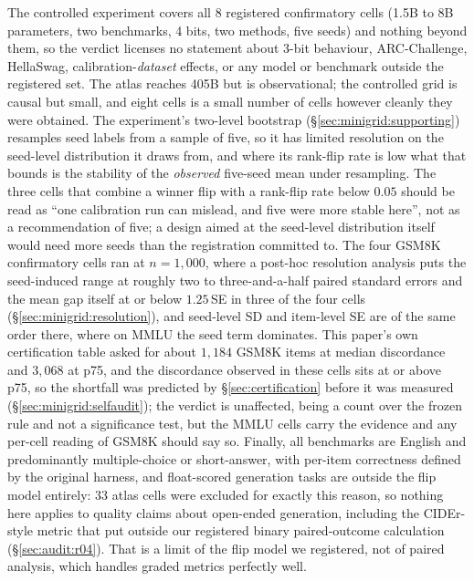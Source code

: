 %
The controlled experiment covers all 8 registered confirmatory cells (1.5B to
8B parameters, two benchmarks, 4 bits, two methods, five seeds) and nothing
beyond them, so the verdict licenses no statement about 3-bit behaviour,
ARC-Challenge, HellaSwag, calibration-\emph{dataset} effects, or any model or
benchmark outside the registered set. The atlas reaches 405B but is
observational; the controlled grid is causal but small, and eight cells is a
small number of cells however cleanly they were obtained. The experiment's
two-level bootstrap (\S\ref{sec:minigrid:supporting}) resamples seed labels from a sample
of five, so it has limited resolution on the seed-level distribution it draws
from, and where its rank-flip rate is low what that bounds is the stability of
the \emph{observed} five-seed mean under resampling. The three cells that
combine a winner flip with a rank-flip rate below $0.05$ should be read as
``one calibration run can mislead, and five were more stable here'', not as a
recommendation of five; a design aimed at the seed-level distribution itself
would need more seeds than the registration committed to. The four GSM8K
confirmatory cells ran at $n = 1{,}000$, where a post-hoc resolution analysis
puts the seed-induced range at roughly two to three-and-a-half paired standard
errors and the mean gap itself at or below $1.25$\,SE in three of the four cells
(\S\ref{sec:minigrid:resolution}), and seed-level SD and item-level SE are of
the same order there, where on MMLU the seed term dominates. This paper's own
certification table asked for about $1{,}184$ GSM8K items at median discordance
and $3{,}068$ at p75, and the discordance observed in these cells sits at or
above p75, so the shortfall was predicted by \S\ref{sec:certification} before it
was measured (\S\ref{sec:minigrid:selfaudit}); the verdict is unaffected, being
a count over the frozen rule and not a significance test, but the MMLU cells
carry the evidence and any per-cell reading of GSM8K should say so. Finally, all
benchmarks are English and predominantly multiple-choice or short-answer, with
per-item correctness defined by the original harness, and float-scored
generation tasks are outside the flip model entirely: 33 atlas cells were
excluded for exactly this reason, so nothing here applies to quality claims
about open-ended generation, including the CIDEr-style metric that put
\AuditOutsideFrameworkClaim{} outside our registered binary paired-outcome
calculation (\S\ref{sec:audit:r04}). That is a limit of the flip model we
registered, not of paired analysis, which handles graded metrics perfectly well.

